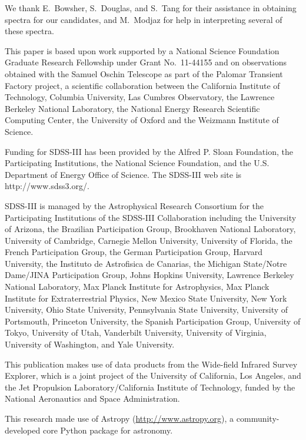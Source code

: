 \documentclass{emulateapj}
\begin{document}
\acknowledgments
We thank E.~Bowsher, S.~Douglas, and S.~Tang for their assistance in obtaining spectra for our candidates, and M.~Modjaz for help in interpreting several of these spectra.

This paper is based upon work supported by a National Science Foundation Graduate Research Fellowship under Grant No.\ 11-44155 and on observations obtained with the Samuel Oschin Telescope as part of the Palomar Transient Factory project, a scientific collaboration between the California Institute of Technology, Columbia University, Las Cumbres Observatory, the Lawrence Berkeley National Laboratory, the National Energy Research Scientific Computing Center, the University of Oxford and the Weizmann Institute of Science. 

Funding for SDSS-III has been provided by the Alfred P. Sloan Foundation, the Participating Institutions, the National Science Foundation, and the U.S. Department of Energy Office of Science. The SDSS-III web site is http://www.sdss3.org/.

SDSS-III is managed by the Astrophysical Research Consortium for the Participating Institutions of the SDSS-III Collaboration including the University of Arizona, the Brazilian Participation Group, Brookhaven National Laboratory, University of Cambridge, Carnegie Mellon University, University of Florida, the French Participation Group, the German Participation Group, Harvard University, the Instituto de Astrofisica de Canarias, the Michigan State/Notre Dame/JINA Participation Group, Johns Hopkins University, Lawrence Berkeley National Laboratory, Max Planck Institute for Astrophysics, Max Planck Institute for Extraterrestrial Physics, New Mexico State University, New York University, Ohio State University, Pennsylvania State University, University of Portsmouth, Princeton University, the Spanish Participation Group, University of Tokyo, University of Utah, Vanderbilt University, University of Virginia, University of Washington, and Yale University. 

This publication makes use of data products from the Wide-field Infrared Survey Explorer, which is a joint project of the University of California, Los Angeles, and the Jet Propulsion Laboratory/California Institute of Technology, funded by the National Aeronautics and Space Administration.

This research made use of Astropy (\url{http://www.astropy.org}), a community-developed core Python package for astronomy.

%
%
\end{document}
